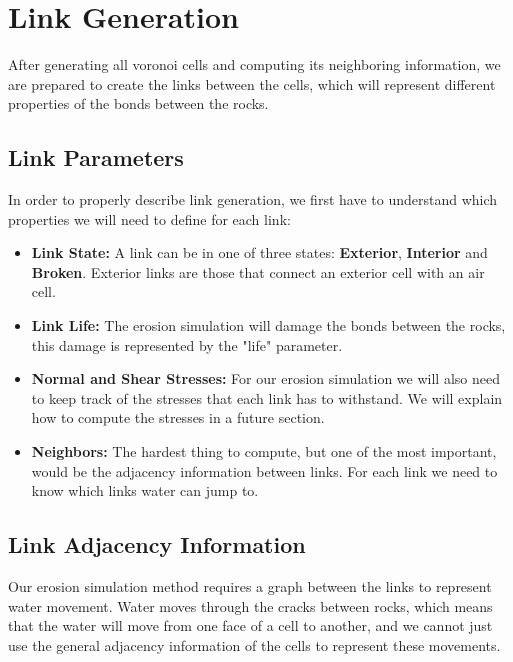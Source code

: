 \section{Link Generation}
After generating all voronoi cells and computing its neighboring information, 
we are prepared to create the links between the cells, which will represent 
different properties of the bonds between the rocks.

\subsection{Link Parameters} \label{sec:linkParams}
In order to properly describe link generation, we first have to understand
which properties we will need to define for each link:

\begin{itemize}
    \item \textbf{Link State:} A link can be in one of three states:
    \textbf{Exterior}, \textbf{Interior} and \textbf{Broken}. Exterior 
    links are those that connect an exterior cell with an air cell.
    \item \textbf{Link Life:} The erosion simulation will damage the 
    bonds between the rocks, this damage is represented by the "life"
    parameter.
    \item \textbf{Normal and Shear Stresses:} For our erosion simulation 
    we will also need to keep track of the stresses that each link has 
    to withstand. We will explain how to compute the stresses in a future section.
    \item \textbf{Neighbors:} The hardest thing to compute, but one 
    of the most important, would be the adjacency information between 
    links. For each link we need to know which links water can jump 
    to. 
\end{itemize}

\subsection{Link Adjacency Information}

Our erosion simulation method requires a graph between the links  
to represent water movement. Water moves through the 
cracks between rocks, which means that the water will move from one 
face of a cell to another, and we cannot just use the general 
adjacency information of the cells to represent these movements. 

\vspace{10pt}

